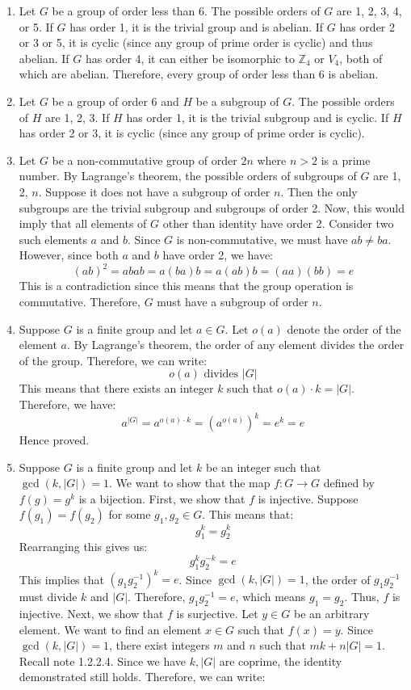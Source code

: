 \documentclass[openany]{book}
\begin{document}
\begin{enumerate}
    \item Let \(G\) be a group of order less than 6. The possible orders of \(G\) are 1, 2, 3, 4, or 5. If \(G\) has order 1, it is the trivial group and is abelian. If \(G\) has order 2 or 3 or 5, it is cyclic (since any group of prime order is cyclic) and thus abelian. If \(G\) has order 4, it can either be isomorphic to \(\mathbb{Z}_4\) or \(V_4\), both of which are abelian. Therefore, every group of order less than 6 is abelian.
    \item Let \(G\) be a group of order 6 and \(H\) be a subgroup of \(G\). The possible orders of \(H\) are 1, 2, 3. If \(H\) has order 1, it is the trivial subgroup and is cyclic. If \(H\) has order 2 or 3, it is cyclic (since any group of prime order is cyclic).
    \item Let \(G\) be a non-commutative group of order \(2n\) where \(n > 2\) is a prime number. By Lagrange's theorem, the possible orders of subgroups of \(G\) are 1, 2, \(n\). Suppose it does not have a subgroup of order \(n\). Then the only subgroups are the trivial subgroup and subgroups of order 2. Now, this would imply that all elements of \(G\) other than identity have order 2. Consider two such elements \(a\) and \(b\). Since \(G\) is non-commutative, we must have \(ab \neq ba\). However, since both \(a\) and \(b\) have order 2, we have:
    \[(ab)^2 = abab = a(ba)b = a(ab)b = (aa)(bb) = e\]
    This is a contradiction since this means that the group operation is commutative. Therefore, \(G\) must have a subgroup of order \(n\).
    \item Suppose \(G\) is a finite group and let \(a \in G\). Let \(o(a)\) denote the order of the element \(a\). By Lagrange's theorem, the order of any element divides the order of the group. Therefore, we can write:
    \[o(a) \text{ divides } |G|\]
    This means that there exists an integer \(k\) such that \(o(a) \cdot k = |G|\). Therefore, we have:
    \[a^{|G|} = a^{o(a) \cdot k} = (a^{o(a)})^k = e^k = e\]
    Hence proved.
    \item Suppose \(G\) is a finite group and let \(k\) be an integer such that \(\gcd(k, |G|) = 1\). We want to show that the map \(f: G \to G\) defined by \(f(g) = g^k\) is a bijection. First, we show that \(f\) is injective. Suppose \(f(g_1) = f(g_2)\) for some \(g_1, g_2 \in G\). This means that:
    \[g_1^k = g_2^k\]
    Rearranging this gives us:
    \[g_1^k g_2^{-k} = e\]
    This implies that \((g_1 g_2^{-1})^k = e\). Since \(\gcd(k, |G|) = 1\), the order of \(g_1 g_2^{-1}\) must divide \(k\) and \(|G|\). Therefore, \(g_1 g_2^{-1} = e\), which means \(g_1 = g_2\). Thus, \(f\) is injective. Next, we show that \(f\) is surjective. Let \(y \in G\) be an arbitrary element. We want to find an element \(x \in G\) such that \(f(x) = y\). Since \(\gcd(k, |G|) = 1\), there exist integers \(m\) and \(n\) such that \(mk + n|G| = 1\). Recall note 1.2.2.4. Since we have $k, |G|$ are coprime, the identity demonstrated still holds. Therefore, we can write:

\end{enumerate}
\end{document}
